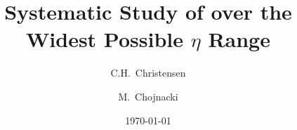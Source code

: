 \documentclass[compat,11pt]{alicenote}
\title{Systematic Study of \ndndeta{} over the Widest Possible $\eta$
  Range}
\institute{1}{Niels Bohr Institute}
\author[C.H.~Christensen \emph{et al}]{%
  C.H.~Christensen\inst[*]{} \and 
  M.~Chojnacki\inst{1}}
\date{\today}
\begin{document}
\maketitle{}
\renewcommand*{\thefootnote}{\arabic{footnote}}

\cleardoublepage
\tableofcontents 





\appendix 




\end{document}
